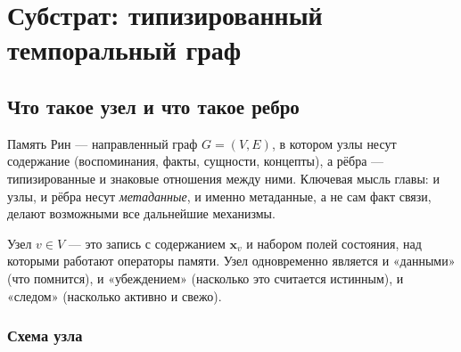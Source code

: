 \chapter{Субстрат: типизированный темпоральный граф}
\label{ch:substrate}

\section{Что такое узел и что такое ребро}

Память Рин — направленный граф $G=(V,E)$, в котором узлы несут содержание
(воспоминания, факты, сущности, концепты), а рёбра — типизированные и знаковые
отношения между ними. Ключевая мысль главы: и узлы, и рёбра несут
\emph{метаданные}, и именно метаданные, а не сам факт связи, делают возможными
все дальнейшие механизмы.

\begin{definition}
Узел $v\in V$ — это запись с содержанием $\mathbf{x}_v$ и набором полей состояния,
над которыми работают операторы памяти. Узел одновременно является и «данными»
(что помнится), и «убеждением» (насколько это считается истинным), и «следом»
(насколько активно и свежо).
\end{definition}

\subsection{Схема узла}

